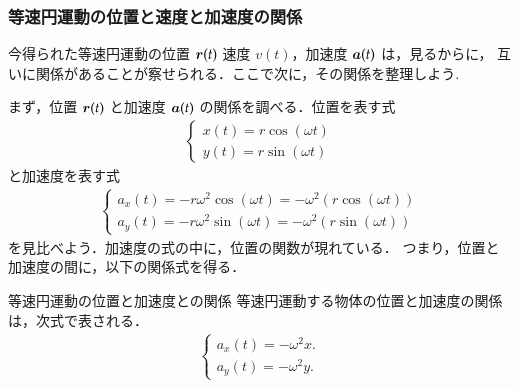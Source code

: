             \subsubsection{等速円運動の位置と速度と加速度の関係}
                今得られた等速円運動の位置 $\boldsymbol{r}(t)$ 速度 $v(t)$，加速度 $\boldsymbol{a}(t)$ は，見るからに，
                互いに関係があることが察せられる．ここで次に，その関係を整理しよう.

                まず，位置 $\boldsymbol{r}(t)$ と加速度 $\boldsymbol{a}(t)$ の関係を調べる．位置を表す式
                    \begin{align*}
                        \begin{cases}
                        \displaystyle x(t) = r\cos( \omega t ) \\
                        \displaystyle y(t) = r\sin( \omega t )
                        \end{cases}
                    \end{align*}
                    と加速度を表す式
                    \begin{align*}
                        \begin{cases}
                        \displaystyle a_{x}(t) = -r\omega^{2} \cos(\omega t) = -\omega^{2}( r \cos(\omega t) )\\
                        \displaystyle a_{y}(t) =-r\omega^{2} \sin(\omega t) = -\omega^{2} ( r \sin(\omega t) )
                        \end{cases}
                    \end{align*}
                を見比べよう．加速度の式の中に，位置の関数が現れている．
                つまり，位置と加速度の間に，以下の関係式を得る．
                    \begin{myshadebox}{等速円運動の位置と加速度との関係}
                        等速円運動する物体の位置と加速度の関係は，次式で表される．
                        \begin{align}
                            \begin{cases}
                            \displaystyle a_{x}(t) = -\omega^{2} x.\\
                            \displaystyle a_{y}(t) = -\omega^{2} y.
                            \end{cases}
                        \end{align}
                    \end{myshadebox}


